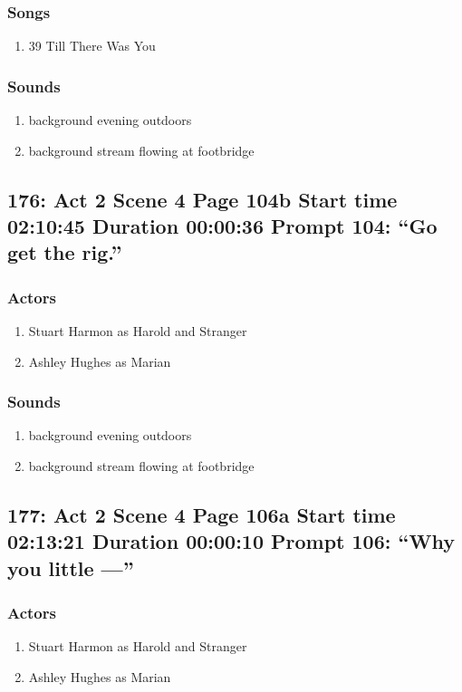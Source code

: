 \subsubsection{Songs}
\begin{enumerate}
\item 39 Till There Was You
\end{enumerate}\subsubsection{Sounds}
\begin{enumerate}
\item background evening outdoors
\item background stream flowing at footbridge
\end{enumerate}
\subsection{176: Act 2 Scene 4 Page 104b Start time 02:10:45 Duration 00:00:36 Prompt 104: ``Go get the rig.''}

\subsubsection{Actors}
\begin{enumerate}
\item Stuart Harmon as Harold and Stranger
\item Ashley Hughes as Marian
\end{enumerate}

\subsubsection{Sounds}
\begin{enumerate}
\item background evening outdoors
\item background stream flowing at footbridge
\end{enumerate}
\subsection{177: Act 2 Scene 4 Page 106a Start time 02:13:21 Duration 00:00:10 Prompt 106: ``Why you little ---''}

\subsubsection{Actors}
\begin{enumerate}
\item Stuart Harmon as Harold and Stranger
\item Ashley Hughes as Marian
\end{enumerate}

